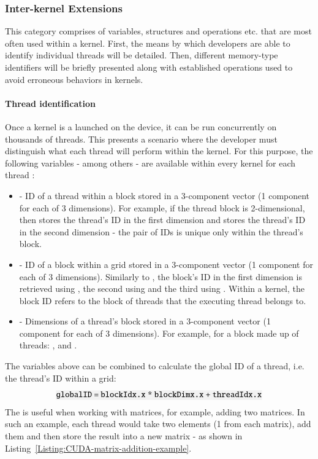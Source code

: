 \subsubsection{Inter-kernel Extensions}\label{Subsubsection:CUDA-C++-extensions-inter-kernel-extensions}
This category comprises of variables, structures and operations etc. that are most often used within a kernel. First, the means by which developers are able to identify individual threads will be detailed. Then, different memory-type identifiers will be briefly presented along with established operations used to avoid erroneous behaviors in kernels.

\paragraph{Thread identification}
Once a kernel is a launched on the device, it can be run concurrently on thousands of threads. This presents a scenario where the developer must distinguish what each thread will perform within the kernel. For this purpose, the following variables - among others - are available within every kernel for each thread \cite{NVIDIAMay2022}:

\begin{itemize}
	\item {} - ID of a thread within a block stored in a 3-component vector (1 component for each of 3 dimensions). For example, if the thread block is 2-dimensional, then  stores the thread's ID in the first dimension and  stores the thread's ID in the second dimension - the pair of IDs is unique only within the thread's block.
	\item {} - ID of a block within a grid stored in a 3-component vector (1 component for each of 3 dimensions). Similarly to , the block's ID in the first dimension is retrieved using , the second using  and the third using . Within a kernel, the block ID refers to the block of threads that the executing thread belongs to.
	\item {} - Dimensions of a thread's block stored in a 3-component vector (1 component for each of 3 dimensions). For example, for a block made up of  threads: ,  and .
\end{itemize}

The variables above can be combined to calculate the global ID of a thread, i.e. the thread's ID within a grid:
$$\code{globalID = blockIdx.x * blockDimx.x + threadIdx.x}$$
The  is useful when working with matrices, for example, adding two matrices. In such an example, each thread would take two elements (1 from each matrix), add them and then store the result into a new matrix - as shown in Listing~\ref{Listing:CUDA-matrix-addition-example}.

